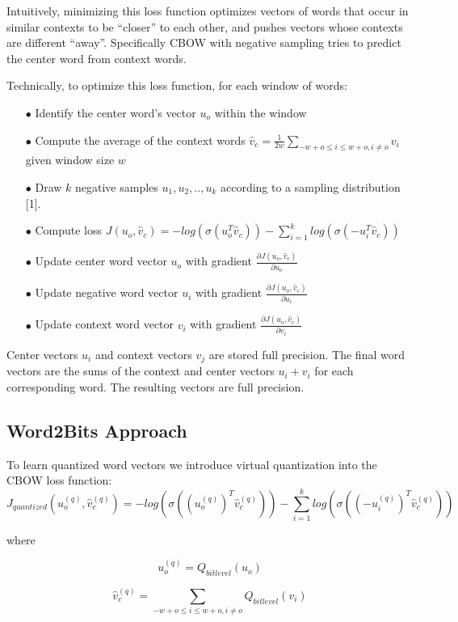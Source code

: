 \documentclass{article} %
\begin{document}
Intuitively, minimizing this loss function optimizes vectors of words
that occur in similar contexts to be ``closer'' to each other, and
pushes vectors whose contexts are different ``away''. Specifically
CBOW with negative sampling tries to predict the center word from
context words.

Technically, to optimize this loss function, for each window of words:

\begin{enumerate}

\item[$\bullet$] Identify the center word's vector $u_o$ within the window
\item[$\bullet$] Compute the average of the context words $\hat{v}_c = \frac{1}{2w} \sum_{-w+o \leq i \leq w+o, i \neq o} v_i$ given window size $w$
\item[$\bullet$] Draw $k$ negative samples $u_1, u_2, .., u_k$ according to a sampling distribution [1].
\item[$\bullet$] Compute loss $J(u_o, \hat{v}_c) = -log(\sigma(u_o^T\hat{v}_c)) - \sum_{i=1}^{k} log(\sigma(-u_i^T\hat{v}_c))$
\item[$\bullet$] Update center word vector $u_o$ with gradient $\frac{\partial J(u_o, \hat{v}_c)}{\partial u_o}$
\item[$\bullet$] Update negative word vector $u_i$ with gradient $\frac{\partial J(u_o, \hat{v}_c)}{\partial u_i}$
\item[$\bullet$] Update context word vector $v_i$ with gradient $\frac{\partial J(u_o, \hat{v}_c)}{\partial v_i}$
\end{enumerate}

Center vectors $u_i$ and context vectors $v_j$ are stored full
precision. The final word vectors are the sums of the context and
center vectors $u_i + v_i$ for each corresponding word. The resulting
vectors are full precision.

\subsection{Word2Bits Approach}
To learn quantized word vectors we introduce virtual quantization into the CBOW loss function:
$$
J_{quantized}(u^{(q)}_o, \hat{v}^{(q)}_c) = -log(\sigma((u^{(q)}_{o})^{T} \hat{v}^{(q)}_c)) - \sum_{i=1}^{k} log(\sigma((-u^{(q)}_i)^T\hat{v}^{(q)}_c))
$$

where

$$
u^{(q)}_o = Q_{bitlevel}(u_o)
$$

$$
\hat{v}^{(q)}_c = \sum_{-w+o \leq i \leq w+o,i \neq o} Q_{bitlevel}(v_i)
$$
\end{document}
